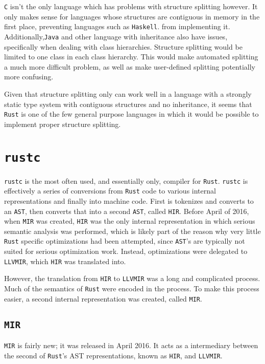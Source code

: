 \documentclass[12pt,oneside]{book}
\newcommand{\rustname}{{\texttt{Rust}}}
\def \rust {\rustname{}\xspace}
\newcommand{\rustcname}{{\texttt{rustc}}}
\def \rustc {\rustcname{}\xspace}
\newcommand{\cname}{{\texttt{C}}}
\def \c {\cname{}\xspace}
\newcommand{\mirname}{{\texttt{MIR}}}
\def \mir {\mirname{}\xspace}
\newcommand{\hirname}{{\texttt{HIR}}}
\def \hir {\hirname{}\xspace}
\newcommand{\llvmirname}{{\texttt{LLVMIR}}}
\def \llvmir {\llvmirname{}\xspace}
\begin{document}
\c isn't the only language which has problems with structure splitting
however. It only makes sense for languages whose structures are contiguous
in memory in the first place, preventing languages such as \texttt{Haskell}.
from implementing it.  Additionally,\texttt{Java} and 
other language with inheritance also
have issues, specifically when dealing with class hierarchies. Structure
splitting would be limited to one class in each class hierarchy. This would
make automated splitting a much more difficult problem, as well as 
make user-defined splitting potentially more confusing.

Given that structure splitting only can work well in a language with
a strongly static type system with contiguous structures and no inheritance,
it seems that \rust is one of the few general purpose languages in which
it would be possible to implement proper structure splitting.

\section{\rustc}
\label{sec:rustc}

\rustc is the most often used, and essentially only, compiler for \rust.
\rustc is effectively a series of conversions from
\rust code to various internal representations and finally into machine code.
First is tokenizes and converts to an \texttt{AST}, then converts that into a
second \texttt{AST}, called \hir. Before April of 2016, when \mir was created,
\hir was the only
internal representation in which serious semantic analysis was performed, which
is likely part of the reason why very little \rust specific optimizations had
been attempted, since \texttt{AST}'s are typically not suited for serious
optimization work. Instead, optimizations were delegated to \llvmir, which \hir
was translated into.

However, the translation from \hir to \llvmir was a long and complicated process.
Much of the semantics of \rust were encoded in the process. To make this 
process easier, a second internal representation was created, called \mir.	


\subsection{\mir}
\mir is fairly new; it was released in April 2016\cite{mirintro}. It acts as a
intermediary between the second of \rust's AST representations, known as \hir,
and \llvmir.
\end{document}
